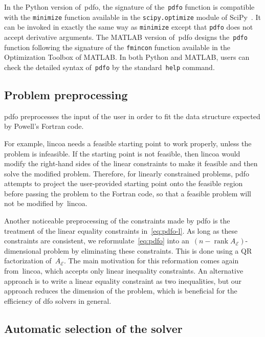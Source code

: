 \documentclass[
    smallextended,  %
    final,        %
]{svjour3}
\DeclareMathOperator\rank{rank}
\newcommand{\aeq}{A_{\scriptscriptstyle\mathcal{E}}}
\newcommand{\pdfofun}{\texttt{pdfo}\xspace}
\begin{document}
In the Python version of~\gls{pdfo}, the signature of the~\pdfofun function is compatible with
the \texttt{minimize} function available in the \texttt{scipy.optimize} module of
SciPy~\cite{Virtanen_Etal_2020}. It can be invoked in exactly
the same way as \texttt{minimize} except that \pdfofun does not accept derivative arguments.
The MATLAB version of~\gls{pdfo} designs the~\pdfofun function following the signature of
the \texttt{fmincon} function available in the Optimization Toolbox of MATLAB.
In both Python and MATLAB, users can check the detailed syntax of~\pdfofun by the
standard~\texttt{help} command.


\subsection{Problem preprocessing}
\label{subsec:pdfo-preprocessing}

\gls{pdfo} preprocesses the input of the user in order to fit the data structure expected by
Powell's Fortran code.

For example, \gls{lincoa} needs a feasible starting point to work properly, unless the problem is
infeasible. If the starting point is not feasible, then \gls{lincoa} would modify the right-hand
sides of the linear constraints to make it feasible and then solve the modified problem.
Therefore, for linearly constrained problems, \gls{pdfo} attempts to project the user-provided
starting point onto the feasible region before passing the problem to the Fortran code, so that
a feasible problem will not be modified by~\gls{lincoa}.

Another noticeable preprocessing of the constraints made by \gls{pdfo} is the treatment of the
linear equality constraints in~\eqref{eq:pdfo-l}.
As long as these constraints are consistent, we reformulate~\eqref{eq:pdfo} into
an~$(n - \rank \aeq)$-dimensional problem by eliminating these constraints.  This is done using a
QR factorization of~$\aeq$. The main motivation for this reformation comes again from~\gls{lincoa},
which accepts only linear inequality constraints. An alternative approach is to write a linear
equality constraint as two inequalities, but our approach reduces the dimension of the problem,
which is beneficial for the efficiency of \gls{dfo} solvers in general.


\subsection{Automatic selection of the solver}
\label{subsec:solver-selection}
\end{document}
